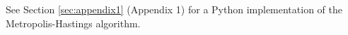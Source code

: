 See Section \ref{sec:appendix1} (Appendix 1) for a Python implementation of the Metropolis-Hastings algorithm.